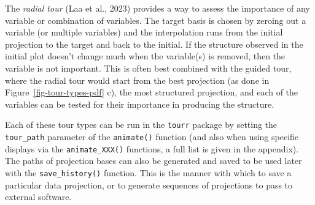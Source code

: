 \documentclass[
  letterpaper,
]{krantz}
\begin{document}
The \emph{radial tour} (Laa et al., 2023) provides a way to assess the
importance of any variable or combination of variables. The target basis
is chosen by zeroing out a variable (or multiple variables) and the
interpolation runs from the initial projection to the target and back to
the initial. If the structure observed in the initial plot doesn't
change much when the variable(s) is removed, then the variable is not
important. This is often best combined with the guided tour, where the
radial tour would start from the best projection (as done in
Figure~\ref{fig-tour-types-pdf} c), the most structured projection, and
each of the variables can be tested for their importance in producing
the structure.

Each of these tour types can be run in the \texttt{tourr} package by
setting the \texttt{tour\_path} parameter of the \texttt{animate()}
function (and also when using specific displays via the
\texttt{animate\_XXX()} functions, a full list is given in the
appendix). The paths of projection bases can also be generated and saved
to be used later with the \texttt{save\_history()} function. This is the
manner with which to save a particular data projection, or to generate
sequences of projections to pass to external software.
\end{document}
